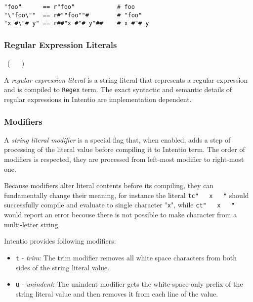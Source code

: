 \begin{example}
\begin{lstlisting}
"foo"      == r"foo"            # foo
"\"foo\""  == r#""foo""#        # "foo"
"x #\"# y" == r##"x #"# y"##    # x #"# y
\end{lstlisting}
\end{example}

\subsubsection*{Regular Expression Literals}

\begin{bnf}
   \eq {} \ ( \  \gor {} \ )
\end{bnf}

A \emph{regular expression literal} is a string literal that represents a regular expression and is compiled to \lstinline{Regex} term. The exact syntactic and semantic details of regular expressions in Intentio are implementation dependent.

\subsubsection*{Modifiers}

\begin{bnf}
   \eq {} \gor {}
\end{bnf}

A \emph{string literal modifier} is a special flag that, when enabled, adds a step of processing of the literal value before compiling it to Intentio term. The order of modifiers is respected, they are processed from left-most modifier to right-most one.

Because modifiers alter literal contents before its compiling, they can fundamentally change their meaning, for instance the literal \lstinline{tc"   x   "} should successfully compile and evaluate to single character "\texttt{x}", while \lstinline{ct"   x   "} would report an error becouse there is not possible to make character from a multi-letter string.

Intentio provides following modifiers:

\begin{itemize}
  \item \texttt{t} - \emph{trim}: The trim modifier removes all white space characters from both sides of the string literal value.
  \item \texttt{u} - \emph{unindent}: The unindent modifier gets the white-space-only prefix of the string literal value and then removes it from each line of the value.
\end{itemize}


